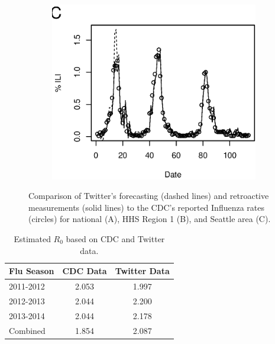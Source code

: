 \begin{figure}
\begin{subfigure}[b]{0.3\textwidth}
	\includegraphics[width=\textwidth]{longitude/figs/nowcastLocalExample.eps}
\end{subfigure}
\caption{Comparison of Twitter's forecasting (dashed lines) and retroactive measurements (solid lines) to the CDC's reported Influenza rates (circles) for national (A), HHS Region 1 (B), and Seattle area (C).}
\label{fig:curves}
\end{figure}



\begin{table}[h]
\centering
\begin{tabular}{lcc}
Flu Season & CDC Data & Twitter Data\\   \midrule
 \rowcolor{lightblue} 2011-2012&  2.053 &  1.997\\ 

2012-2013& 2.044 &  2.200\\ 

\rowcolor{lightblue} 2013-2014& 2.044&  2.178 \\ 

Combined& 1.854  &  2.087 \\
\end{tabular}
\captionsetup{singlelinecheck=off}
\caption[Estimated R0 based on CDC and Twitter data]{Estimated \(R_0\) based on CDC and Twitter data.}
\label{tab:nationalr0}
\end{table}



